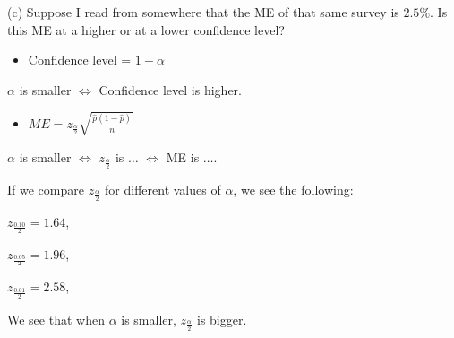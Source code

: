 \documentclass[
  11pt,
  ignorenonframetext,
]{beamer}
\providecommand{\tightlist}{%
  \setlength{\itemsep}{0pt}\setlength{\parskip}{0pt}}
\begin{document}
\begin{frame}{(c) Suppose I read from somewhere that the ME of that same
survey is \(2.5\%\). Is this ME at a higher or at a lower confidence
level?}
\protect\hypertarget{c-suppose-i-read-from-somewhere-that-the-me-of-that-same-survey-is-2.5.-is-this-me-at-a-higher-or-at-a-lower-confidence-level}{}
\begin{itemize}
\tightlist
\item
  Confidence level = \(1-\alpha\)
\end{itemize}

\quad\quad\quad \(\alpha\) is smaller \(\Leftrightarrow\) Confidence
level is higher.

\begin{itemize}
\tightlist
\item
  \(ME = z_{\frac{\alpha}{2}} \sqrt{\frac{\hat{p}(1-\hat{p})}{n}}\)
\end{itemize}

\quad\quad\quad \(\alpha\) is smaller \(\Leftrightarrow\)
\(z_{\frac{\alpha}{2}}\) is \(\ldots\) \(\Leftrightarrow\) ME is
\(\ldots\).
\end{frame}

\begin{frame}{}
\protect\hypertarget{section}{}
If we compare \(z_{\frac{\alpha}{2}}\) for different values of
\(\alpha\), we see the following:

\(z_{\frac{0.10}{2}} = 1.64\),

\(z_{\frac{0.05}{2}} = 1.96\),

\(z_{\frac{0.01}{2}} = 2.58\),

We see that when \(\alpha\) is smaller, \(z_{\frac{\alpha}{2}}\) is
bigger.
\end{frame}
\end{document}
